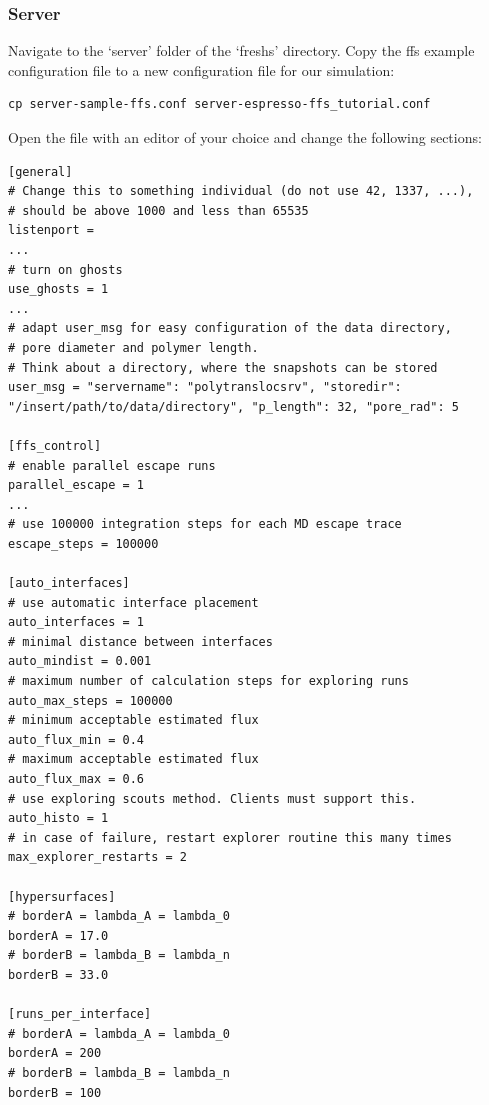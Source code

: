 \documentclass[a4paper,oneside]{article}
\newenvironment{mylisting}
{\begin{list}{}{\setlength{\leftmargin}{1em}}\item\scriptsize\bfseries}
{\end{list}}
\begin{document}
\subsubsection{Server}
Navigate to the `server' folder of the `freshs' directory. Copy the ffs example configuration file to a new configuration file for our simulation:
\begin{mylisting}
\begin{verbatim}
cp server-sample-ffs.conf server-espresso-ffs_tutorial.conf
\end{verbatim}
\end{mylisting}
Open the file with an editor of your choice and change the following sections:
\begin{mylisting}
\begin{verbatim}
[general]
# Change this to something individual (do not use 42, 1337, ...), 
# should be above 1000 and less than 65535
listenport = 
...
# turn on ghosts
use_ghosts = 1
...
# adapt user_msg for easy configuration of the data directory, 
# pore diameter and polymer length.
# Think about a directory, where the snapshots can be stored
user_msg = "servername": "polytranslocsrv", "storedir": 
"/insert/path/to/data/directory", "p_length": 32, "pore_rad": 5

[ffs_control]
# enable parallel escape runs
parallel_escape = 1
...
# use 100000 integration steps for each MD escape trace
escape_steps = 100000

[auto_interfaces]
# use automatic interface placement
auto_interfaces = 1
# minimal distance between interfaces
auto_mindist = 0.001
# maximum number of calculation steps for exploring runs
auto_max_steps = 100000
# minimum acceptable estimated flux
auto_flux_min = 0.4
# maximum acceptable estimated flux
auto_flux_max = 0.6
# use exploring scouts method. Clients must support this.
auto_histo = 1
# in case of failure, restart explorer routine this many times
max_explorer_restarts = 2

[hypersurfaces]
# borderA = lambda_A = lambda_0
borderA = 17.0
# borderB = lambda_B = lambda_n
borderB = 33.0

[runs_per_interface]
# borderA = lambda_A = lambda_0
borderA = 200
# borderB = lambda_B = lambda_n
borderB = 100
\end{verbatim}
\end{mylisting}
\end{document}

